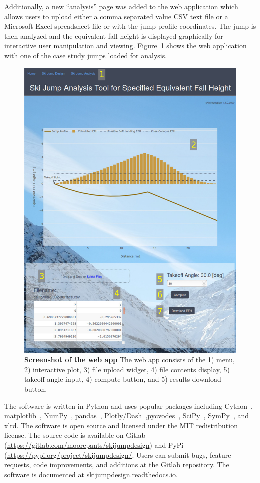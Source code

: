 \documentclass{article}
\begin{document}
Additionally, a new
``analysis'' page was added to the web application which allows users to upload
either a comma separated value CSV text file or a Microsoft Excel spreadsheet
file or with the jump profile coordinates. The jump is then analyzed and the
equivalent fall height is displayed graphically for interactive user
manipulation and viewing. Figure~\ref{fig:web-app-screenshot} shows the web
application with one of the case study jumps loaded for analysis.
%
\begin{figure}
  \centering
  \includegraphics[width=5.00in]{figures/web-app-screenshot.png}
  \caption{\textbf{Screenshot of the web app} The web app consists of the 1)
    menu, 2) interactive plot, 3) file upload widget, 4) file contents display,
    5) takeoff angle input, 4) compute button, and 5) results download button.}
  \label{fig:web-app-screenshot}
\end{figure}

The software is written in Python and uses popular packages including
Cython~\cite{Behnel2011}, matplotlib~\cite{Hunter2007},
NumPy~\cite{Oliphant2006}, pandas~\cite{team2020},
Plotly/Dash~\cite{Inc.2015},pycvodes~\cite{Dalhgren2018},
SciPy~\cite{Virtanen2020}, SymPy~\cite{Meurer2017}, and xlrd.
The software is open source and licensed under the MIT redistribution license.
The source code is available on Gitlab
(\url{https://gitlab.com/moorepants/skijumpdesign}) and PyPi
(\url{https://pypi.org/project/skijumpdesign/}. Users can submit bugs, feature
requests, code improvements, and additions at the Gitlab repository.  The
software is documented at \href{https://skijumpdesign.readthedocs.io}{skijumpdesign.readthedocs.io}.
\end{document}
